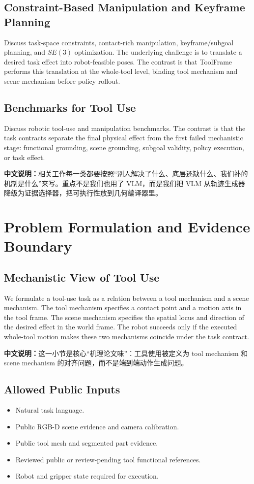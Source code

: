 \documentclass[journal]{IEEEtran}
\newcommand{\method}{ToolFrame}
\newcommand{\cn}[1]{\par\smallskip\noindent\textbf{中文说明：}#1\par\smallskip}
\begin{document}
\subsection{Constraint-Based Manipulation and Keyframe Planning}
Discuss task-space constraints, contact-rich manipulation, keyframe/subgoal
planning, and $SE(3)$ optimization. The underlying challenge is to translate a
desired task effect into robot-feasible poses. The contrast is that \method{}
performs this translation at the whole-tool level, binding tool mechanism and
scene mechanism before policy rollout.

\subsection{Benchmarks for Tool Use}
Discuss robotic tool-use and manipulation benchmarks. The contrast is that the
task contracts separate the final physical effect from the first failed
mechanistic stage: functional grounding, scene grounding, subgoal validity,
policy execution, or task effect.

\cn{相关工作每一类都要按照“别人解决了什么、底层还缺什么、我们补的机制是什么”来写。重点不是我们也用了 VLM，而是我们把 VLM 从轨迹生成器降级为证据选择器，把可执行性放到几何编译器里。}

\section{Problem Formulation and Evidence Boundary}
\subsection{Mechanistic View of Tool Use}
We formulate a tool-use task as a relation between a tool mechanism and a scene
mechanism. The tool mechanism specifies a contact point and a motion axis in
the tool frame. The scene mechanism specifies the spatial locus and direction
of the desired effect in the world frame. The robot succeeds only if the
executed whole-tool motion makes these two mechanisms coincide under the task
contract.

\cn{这一小节是核心“机理论文味”：工具使用被定义为 tool mechanism 和 scene mechanism 的对齐问题，而不是端到端动作生成问题。}

\subsection{Allowed Public Inputs}
\begin{itemize}
  \item Natural task language.
  \item Public RGB-D scene evidence and camera calibration.
  \item Public tool mesh and segmented part evidence.
  \item Reviewed public or review-pending tool functional references.
  \item Robot and gripper state required for execution.
\end{itemize}
\end{document}
